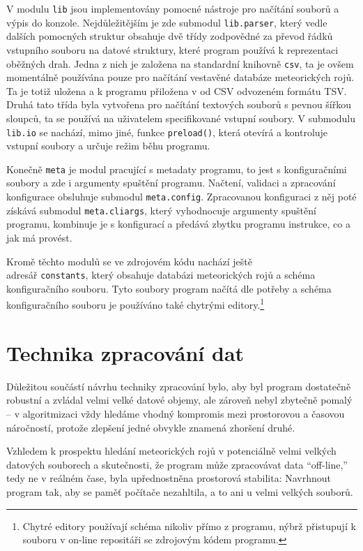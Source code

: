 V modulu \texttt{lib} jsou implementovány pomocné nástroje pro načítání souborů a výpis do konzole. Nejdůležitějším je zde submodul \texttt{lib.parser}, který vedle dalších pomocných struktur obsahuje dvě třídy zodpovědné za převod řádků vstupního souboru na datové struktury, které program používá k reprezentaci oběžných drah. Jedna z nich je založena na standardní knihovně \texttt{csv}, ta je ovšem momentálně používána pouze pro načítání vestavěné databáze meteorických rojů. Ta je totiž uložena a k programu přiložena v od CSV odvozeném formátu TSV. Druhá tato třída byla vytvořena pro načítání textových souborů s pevnou šířkou sloupců, ta se používá na uživatelem specifikované vstupní soubory. V submodulu \texttt{lib.io} se nachází, mimo jiné, funkce \texttt{preload()}, která otevírá a kontroluje vstupní soubory a určuje režim běhu programu.

Konečně \texttt{meta} je modul pracující s metadaty programu, to jest s konfiguračními soubory a zde i argumenty spuštění programu. Načtení, validaci a zpracování konfigurace obsluhuje submodul \texttt{meta.config}. Zpracovanou konfiguraci z něj poté získává submodul \texttt{meta.cliargs}, který vyhodnocuje argumenty spuštění programu, kombinuje je s konfigurací a předává zbytku programu instrukce, co a jak má provést.

\smallskip

Kromě těchto modulů se ve zdrojovém kódu nachází ještě \\adresář \texttt{constants}, který obsahuje databázi meteorických rojů a schéma konfiguračního souboru. Tyto soubory program načítá dle potřeby a schéma konfiguračního souboru je používáno také chytrými editory.\footnote{Chytré editory používají schéma nikoliv přímo z programu, nýbrž přistupují k souboru v on-line repositáři se zdrojovým kódem programu.}

\section{Technika zpracování dat}%
Důležitou součástí návrhu techniky zpracování bylo, aby byl program dostatečně robustní a zvládal velmi velké datové objemy, ale zároveň nebyl zbytečně pomalý -- v algoritmizaci vždy hledáme vhodný kompromis mezi prostorovou a časovou náročností, protože zlepšení jedné obvykle znamená zhoršení druhé.

Vzhledem k prospektu hledání meteorických rojů v potenciálně velmi velkých datových souborech a skutečnosti, že program může zpracovávat data "`off-line,"' tedy ne v reálném čase, byla upřednostněna prostorová stabilita: Navrhnout program tak, aby se paměť počítače nezahltila, a to ani u velmi velkých souborů.

